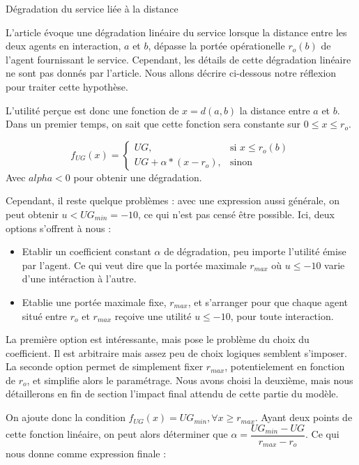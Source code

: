 \begin{hypothese}{Dégradation du service liée à la distance}

L'article évoque une dégradation linéaire du service lorsque la distance entre les deux agents en interaction, $a$ et $b$, dépasse la portée opérationelle $r_o(b)$ de l'agent fournissant le service. Cependant, les détails de cette dégradation linéaire ne sont pas donnés par l'article. Nous allons décrire ci-dessous notre réflexion pour traiter cette hypothèse. \newline

L'utilité perçue est donc une fonction de $x = d(a, b)$ la distance entre $a$ et $b$. Dans un premier temps, on sait que cette fonction sera constante sur $0 \leq x \leq r_o$.

$$ f_{UG}(x)= 
\begin{cases}
    UG,                 & \text{si } x \leq r_o(b)\\
    UG + \alpha * (x - r_o),  & \text{sinon}
\end{cases} $$
Avec $alpha < 0$ pour obtenir une dégradation.\newline

Cependant, il reste quelque problèmes : avec une expression aussi générale, on peut obtenir $u < UG_{min} = -10$, ce qui n'est pas censé être possible. Ici, deux options s'offrent à nous :
\begin{itemize}
    \item Etablir un coefficient constant $\alpha$ de dégradation, peu importe l'utilité émise par l'agent. Ce qui veut dire que la portée maximale $r_{max}$ où $u \leq -10$ varie d'une intéraction à l'autre.
    \item Etablie une portée maximale fixe, $r_{max}$, et s'arranger pour que chaque agent situé entre $r_o$ et $r_{max}$ reçoive une utilité $u \leq -10$, pour toute interaction.
\end{itemize}

La première option est intéressante, mais pose le problème du choix du coefficient. Il est arbitraire mais assez peu de choix logiques semblent s'imposer. La seconde option permet de simplement fixer $r_{max}$, potentielement en fonction de $r_o$, et simplifie alors le paramétrage. Nous avons choisi la deuxième, mais nous détaillerons en fin de section l'impact final attendu de cette partie du modèle.

On ajoute donc la condition $f_{UG}(x) = UG_{min}, \forall x \geq r_{max}$. Ayant deux points de cette fonction linéaire, on peut alors déterminer que $\alpha = \dfrac{UG_{min} - UG}{r_{max} - r_o}$. Ce qui nous donne comme expression finale :


\end{hypothese}
